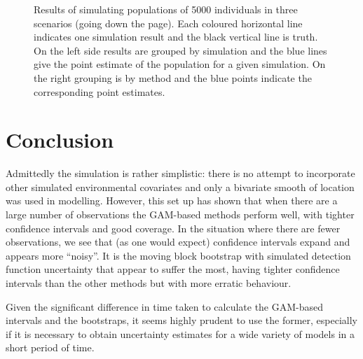 \documentclass[11pt]{amsart}
\begin{document}
\begin{figure}
\begin{center}
\setlength{\tabcolsep}{0mm}
%
%
\caption{Results of simulating populations of 5000 individuals in three scenarios (going down the page). Each coloured horizontal line indicates one simulation result and the black vertical line is truth. On the left side results are grouped by simulation and the blue lines give the point estimate of the population for a given simulation. On the right grouping is by method and the blue points indicate the corresponding point estimates.}
\label{res-500}
\end{center}
\end{figure}

\section{Conclusion}

Admittedly the simulation is rather simplistic: there is no attempt to incorporate other simulated environmental covariates and only a bivariate smooth of location was used in modelling. However, this set up has shown that when there are a large number of observations the GAM-based methods perform well, with tighter confidence intervals and good coverage. In the situation where there are fewer observations, we see that (as one would expect) confidence intervals expand and appears more ``noisy''. It is the moving block bootstrap with simulated detection function uncertainty that appear to suffer the most, having tighter confidence intervals than the other methods but with more erratic behaviour.

Given the significant difference in time taken to calculate the GAM-based intervals and the bootstraps, it seems highly prudent to use the former, especially if it is necessary to obtain uncertainty estimates for a wide variety of models in a short period of time.


\end{document}
